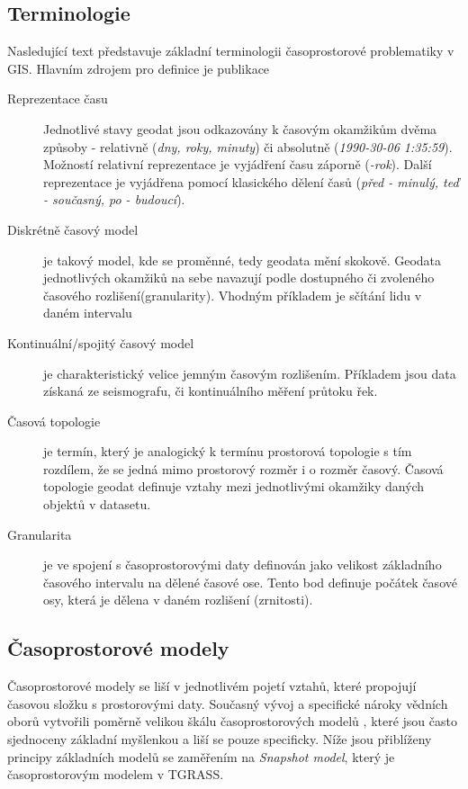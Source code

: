 \documentclass[a4paper,12pt,oneside]{report}
\begin{document}
\subsection{Terminologie}
\label{subsec:terminologie}
Nasledující text představuje základní terminologii časoprostorové problematiky v GIS. Hlavním zdrojem pro definice je publikace \cite{pelekis}
\begin{description}
\item[Reprezentace času] Jednotlivé stavy geodat jsou odkazovány k  časovým okamžikům dvěma způsoby - relativně  (\textit{dny, roky, minuty})  či absolutně (\textit{1990-30-06 1:35:59}). Možností relativní reprezentace je vyjádření času záporně (\textit{-rok}). Další reprezentace je vyjádřena pomocí klasického dělení časů (\textit {před - minulý, teď - současný, po - budoucí}).

\item[Diskrétně časový model] je takový model, kde se proměnné, tedy geodata  mění skokově. Geodata jednotlivých okamžiků na sebe navazují podle dostupného či zvoleného časového rozlišení(granularity). Vhodným příkladem je sčítání lidu v daném intervalu

\item[Kontinuální/spojitý časový model] je charakteristický velice jemným časovým rozlišením. Příkladem jsou data získaná ze seismografu, či kontinuálního měření průtoku řek.

\item[Časová topologie] je termín, který je analogický k termínu prostorová topologie s tím  rozdílem, že se jedná mimo prostorový rozměr i o rozměr časový. Časová topologie geodat definuje vztahy mezi jednotlivými okamžiky daných objektů v datasetu.

\item[Granularita] je ve spojení s časoprostorovými daty definován jako velikost základního časového intervalu na dělené časové ose. Tento bod definuje počátek časové osy, která je dělena v daném rozlišení (zrnitosti). 
\end{description}

\subsection{Časoprostorové modely}

Časoprostorové modely se liší v jednotlivém pojetí vztahů, které propojují časovou složku s prostorovými daty. Současný vývoj a specifické nároky vědních oborů vytvořili poměrně velikou škálu časoprostorových modelů \cite{pelekis}, které jsou často sjednoceny  základní myšlenkou a liší se pouze specificky. Níže jsou přiblíženy principy základních modelů se zaměřením na \textit{Snapshot model}, který je časoprostorovým modelem v TGRASS.
\end{document}
